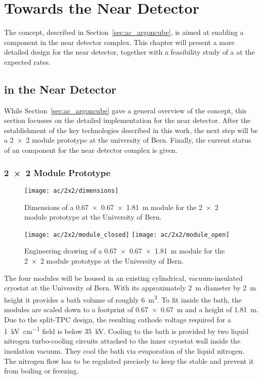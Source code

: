 \chapter{Towards the \dune{} Near Detector}
\label{chap:dune-nd}

The \AC{} concept, described in Section~\ref{sec:ac_argoncube}, is aimed at enabling a \lartpc{} component in the \dune{} near detector complex.
This chapter will present a more detailed design for the near detector, together with a feasibility study of a \lartpc{} at the expected rates.


\section{\AC{} in the \dune{} Near Detector}
\label{sec:dune-nd_ac}

While Section~\ref{sec:ac_argoncube} gave a general overview of the \AC{} concept, this section focusses on the detailed implementation for the \dune{} near detector.
After the establishment of the key technologies described in this work, the next step will be a \num{2 x 2} module prototype at the university of Bern.
Finally, the current status of an \AC{} \lartpc{} component for the \dune{} near detector complex is given.

\subsection*{\num{2 x 2} Module Prototype}

\begin{figure}[htb]
	\centering
	\texttt{[image: ac/2x2/dimensions]}
	\caption{Dimensions of a \SI{0.67 x 0.67 x 1.81}{\metre} module for the \AC{} \num{2 x 2} module \AC{} prototype at the University of Bern.}
	\label{fig:2x2_dim}
\end{figure}

\begin{figure}[htb]
	\centering
	\texttt{[image: ac/2x2/module\_closed]}
	\texttt{[image: ac/2x2/module\_open]}
	\caption{Engineering drawing of a \SI{0.67 x 0.67 x 1.81}{\metre} module for the \AC{} \num{2 x 2} module \AC{} prototype at the University of Bern.}
	\label{fig:2x2_mod}
\end{figure}

The four modules will be housed in an existing cylindrical, vacuum-insulated cryostat at the University of Bern.
With its approximately \SI{2}{\metre} diameter by \SI{2}{\metre} height it provides a \lar{} bath volume of roughly \SI{6}{\metre\cubed}.
To fit inside the bath, the modules are scaled down to a footprint of \SI{0.67 x 0.67}{\metre} and a height of \SI{1.81}{\metre}.
Due to the split-TPC design, the resulting cathode voltage required for a \SI{1}{\kilo\volt\per\centi\metre} field is below \SI{35}{\kilo\volt}.
Cooling to the bath is provided by two liquid nitrogen turbo-cooling circuits attached to the inner cryostat wall inside the insulation vacuum.
They cool the \lar{} bath via evaporation of the liquid nitrogen.
The nitrogen flow has to be regulated precisely to keep the \lar{} stable and prevent it from boiling or freezing.

